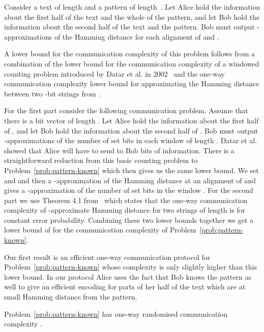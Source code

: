 \begin{problem}\label{prob:pattern-known}
Consider a text  of length  and a pattern  of length~. Let Alice hold the information about the first half of the text and the whole of the pattern, and let Bob hold the information about the second half of the text and the pattern. Bob must output -approximations of the Hamming distance for each alignment of   and .
\end{problem}

A lower bound for the communication complexity of this problem follows from a combination of the lower bound for the communication complexity of a windowed counting problem introduced by Datar et al. in 2002~\cite{DGIM:02} and the one-way communication complexity lower bound for approximating the Hamming distance between two -bit strings from~\cite{JW:2013}. 

For the first part consider the following communication problem. Assume that there is a bit vector  of length .  Let Alice hold the information about the first half of , and let Bob hold the information about the second half of . Bob must output -approximations of the number of set bits in each window of length . Datar et al. showed that 
Alice will have to send to Bob  bits of information. There is a straightforward reduction from this basic counting problem to Problem~\ref{prob:pattern-known} which then gives us the same lower bound. We set  and  and then a -approximation of the Hamming distance at an alignment  of   and  gives  a -approximation of the number of set bits in the window . For the second part we use Theorem 4.1 from~\cite{JW:2013} which states that the one-way communication complexity of -approximate Hamming distance for two strings of length  is  for constant error probability. 
Combining these two lower bounds together we get a lower bound of  for the communication complexity of Problem~\ref{prob:pattern-known}.  

Our first result is an efficient one-way communication protocol for Problem~\ref{prob:pattern-known} whose complexity is only slightly higher than this lower bound.  In our protocol Alice uses the fact that Bob knows the pattern as well to give an efficient encoding for parts of her half of the text which are at small Hamming distance from the pattern.

\begin{theorem}\label{th:pattern-known}
Problem~\ref{prob:pattern-known} has one-way randomised communication complexity .
\end{theorem}

